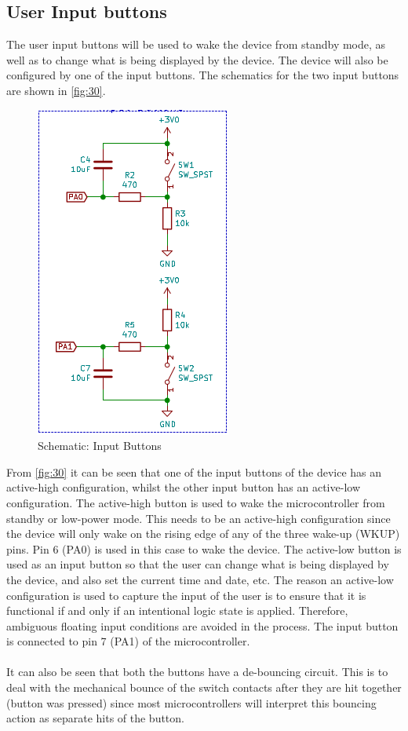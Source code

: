 \subsection{User Input buttons}
The user input buttons will be used to wake the device from standby mode, as well as to change what is being displayed by the device. The device will also be configured by one of the input buttons. The schematics for the two input buttons are shown in \autoref{fig:30}.
\begin{figure}[H]
	\centering
	\includegraphics[scale=0.7]{img/Schematic_Button}
	\caption{Schematic: Input Buttons}
	\label{fig:30}
\end{figure}
\noindent
From \autoref{fig:30} it can be seen that one of the input buttons of the device has an active-high configuration, whilst the other input button has an active-low configuration. The active-high button is used to wake the microcontroller from standby or low-power mode. This needs to be an active-high configuration since the device will only wake on the rising edge of any of the three wake-up (WKUP) pins. Pin 6 (PA0) is used in this case to wake the device. The active-low button is used as an input button so that the user can change what is being displayed by the device, and also set the current time and date, etc. The reason an active-low configuration is used to capture the input of the user is to ensure that it is functional if and only if an intentional logic state is applied. Therefore, ambiguous floating input conditions are avoided in the process. The input button is connected to pin 7 (PA1) of the microcontroller.
\\
\\
It can also be seen that both the buttons have a de-bouncing circuit. This is to deal with the mechanical bounce of the switch contacts after they are hit together (button was pressed) since most microcontrollers will interpret this bouncing action as separate hits of the button.

